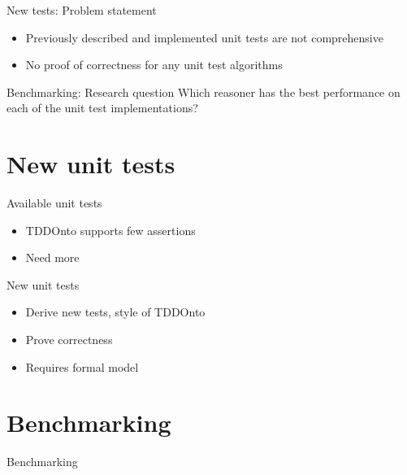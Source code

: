 \documentclass[17pt,mathserif]{beamer}
\begin{document}
\begin{frame}{New tests: Problem statement}
  \begin{itemize}
    \item Previously described and implemented unit tests are not comprehensive
    \item No proof of correctness for any unit test algorithms
  \end{itemize}
\end{frame}

\begin{frame}{Benchmarking: Research question}
  \centering
  Which reasoner has the best performance on each of the unit test implementations?
\end{frame}

\section{New unit tests}

\begin{frame}{Available unit tests}
  \begin{itemize}
    \item TDDOnto supports few assertions
    \item Need more
  \end{itemize}
\end{frame}

\begin{frame}{New unit tests}
  \begin{itemize}
    \item Derive new tests, style of TDDOnto
    \item Prove correctness
    \item Requires formal model
  \end{itemize}
\end{frame}

\section{Benchmarking}

\begin{frame}{Benchmarking}
\end{frame}
\end{document}
